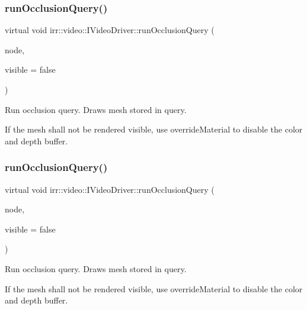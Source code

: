 \subsubsection{\texorpdfstring{run\+Occlusion\+Query()}{runOcclusionQuery()}\hspace{0.1cm}{\footnotesize\ttfamily [1/2]}}
{\footnotesize\ttfamily virtual void irr\+::video\+::\+I\+Video\+Driver\+::run\+Occlusion\+Query (\begin{DoxyParamCaption}\item[{\hyperlink{classirr_1_1scene_1_1ISceneNode}{scene\+::\+I\+Scene\+Node} $\ast$}]{node,  }\item[{bool}]{visible = {\ttfamily false} }\end{DoxyParamCaption})\hspace{0.3cm}{\ttfamily [pure virtual]}}



Run occlusion query. Draws mesh stored in query. 

If the mesh shall not be rendered visible, use override\+Material to disable the color and depth buffer. \mbox{\label{classirr_1_1video_1_1IVideoDriver_aaf92a35268dad06996c4f5edabec249f}} 
\subsubsection{\texorpdfstring{run\+Occlusion\+Query()}{runOcclusionQuery()}\hspace{0.1cm}{\footnotesize\ttfamily [2/2]}}
{\footnotesize\ttfamily virtual void irr\+::video\+::\+I\+Video\+Driver\+::run\+Occlusion\+Query (\begin{DoxyParamCaption}\item[{\hyperlink{classirr_1_1scene_1_1ISceneNode}{scene\+::\+I\+Scene\+Node} $\ast$}]{node,  }\item[{bool}]{visible = {\ttfamily false} }\end{DoxyParamCaption})\hspace{0.3cm}{\ttfamily [pure virtual]}}



Run occlusion query. Draws mesh stored in query. 

If the mesh shall not be rendered visible, use override\+Material to disable the color and depth buffer. \mbox{\label{classirr_1_1video_1_1IVideoDriver_af78022589e5b7cb42b4d6ed2f7950e42}} 
